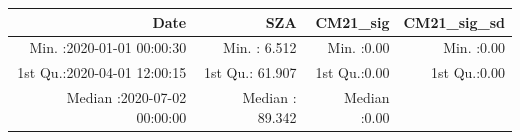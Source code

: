 \documentclass[
  10pt,
  a4paper,oneside]{article}
\begin{document}
\begin{longtable}[]{@{}rrrr@{}}
\toprule
\begin{minipage}[b]{0.34\columnwidth}\raggedleft
Date\strut
\end{minipage} & \begin{minipage}[b]{0.20\columnwidth}\raggedleft
SZA\strut
\end{minipage} & \begin{minipage}[b]{0.17\columnwidth}\raggedleft
CM21\_sig\strut
\end{minipage} & \begin{minipage}[b]{0.17\columnwidth}\raggedleft
CM21\_sig\_sd\strut
\end{minipage}\tabularnewline
\midrule
\endhead
\begin{minipage}[t]{0.34\columnwidth}\raggedleft
Min. :2020-01-01 00:00:30\strut
\end{minipage} & \begin{minipage}[t]{0.20\columnwidth}\raggedleft
Min. : 6.512\strut
\end{minipage} & \begin{minipage}[t]{0.17\columnwidth}\raggedleft
Min. :0.00\strut
\end{minipage} & \begin{minipage}[t]{0.17\columnwidth}\raggedleft
Min. :0.00\strut
\end{minipage}\tabularnewline
\begin{minipage}[t]{0.34\columnwidth}\raggedleft
1st Qu.:2020-04-01 12:00:15\strut
\end{minipage} & \begin{minipage}[t]{0.20\columnwidth}\raggedleft
1st Qu.: 61.907\strut
\end{minipage} & \begin{minipage}[t]{0.17\columnwidth}\raggedleft
1st Qu.:0.00\strut
\end{minipage} & \begin{minipage}[t]{0.17\columnwidth}\raggedleft
1st Qu.:0.00\strut
\end{minipage}\tabularnewline
\begin{minipage}[t]{0.34\columnwidth}\raggedleft
Median :2020-07-02 00:00:00\strut
\end{minipage} & \begin{minipage}[t]{0.20\columnwidth}\raggedleft
Median : 89.342\strut
\end{minipage} & \begin{minipage}[t]{0.17\columnwidth}\raggedleft
Median :0.00\strut
\end{minipage} & \begin{minipage}[t]{0.17\columnwidth}\raggedleft

\end{minipage}
\end{longtable}
\end{document}
